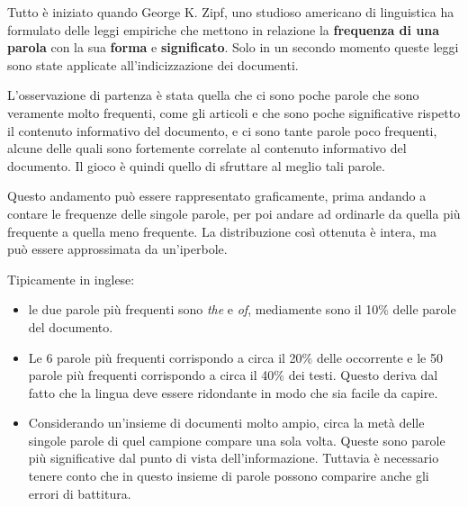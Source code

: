 


Tutto è iniziato quando George K. Zipf, uno studioso americano di linguistica ha formulato delle leggi empiriche che mettono in relazione la \textbf{frequenza di una parola} con la sua \textbf{forma} e \textbf{significato}. 
Solo in un secondo momento queste leggi sono state applicate all'indicizzazione dei documenti.

L'osservazione di partenza è stata quella che ci sono poche parole che sono veramente molto frequenti, come gli articoli e che sono poche significative rispetto il contenuto informativo del documento, e ci sono tante parole poco frequenti, alcune delle quali sono fortemente correlate al contenuto informativo del documento. Il gioco è quindi quello di sfruttare al meglio tali parole.

Questo andamento può essere rappresentato graficamente, prima andando a contare le frequenze delle singole parole, per poi andare ad ordinarle da quella più frequente a quella meno frequente. La distribuzione così ottenuta è intera, ma può essere approssimata da un'iperbole.

Tipicamente in inglese:
\begin{itemize}
	\item le due parole più frequenti sono \textit{the} e \textit{of}, mediamente sono il 10\% delle parole del documento.
	\item Le 6 parole più frequenti corrispondo a circa il 20\% delle occorrente e le 50 parole più frequenti corrispondo a circa il 40\% dei testi. Questo deriva dal fatto che la lingua deve essere ridondante in modo che sia facile da capire.
	\item Considerando un'insieme di documenti molto ampio, circa la metà delle singole parole di quel campione compare una sola volta. Queste sono parole più significative dal punto di vista dell'informazione. Tuttavia è necessario tenere conto che in questo insieme di parole possono comparire anche gli errori di battitura.
\end{itemize}

